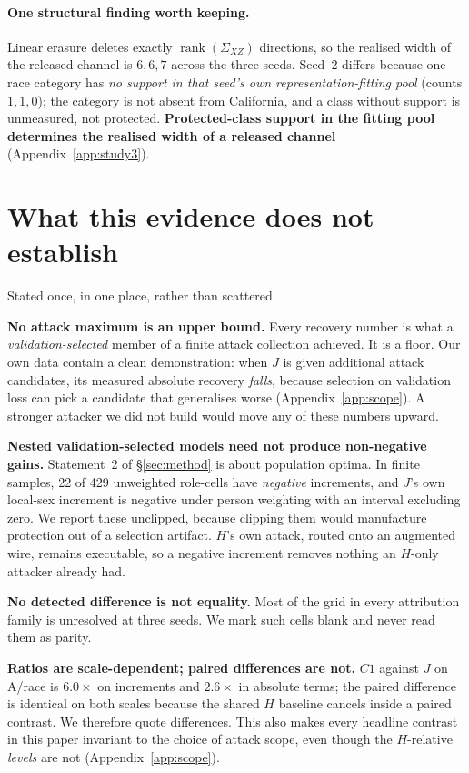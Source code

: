 \documentclass[10pt]{article}
\begin{document}
\paragraph{One structural finding worth keeping.} Linear erasure deletes exactly
$\operatorname{rank}(\Sigma_{XZ})$ directions, so the realised width of the released channel is
$6,6,7$ across the three seeds. Seed~2 differs because one race category has \emph{no support in that
seed's own representation-fitting pool} (counts $1,1,0$); the category is not absent from California,
and a class without support is unmeasured, not protected. \textbf{Protected-class support in the
fitting pool determines the realised width of a released channel} (Appendix~\ref{app:study3}).

\section{What this evidence does not establish}
\label{sec:limits}

Stated once, in one place, rather than scattered.

\textbf{No attack maximum is an upper bound.} Every recovery number is what a
\emph{validation-selected} member of a finite attack collection achieved. It is a floor. Our own data
contain a clean demonstration: when $J$ is given additional attack candidates, its measured absolute
recovery \emph{falls}, because selection on validation loss can pick a candidate that generalises
worse (Appendix~\ref{app:scope}). A stronger attacker we did not build would move any of these numbers
upward.

\textbf{Nested validation-selected models need not produce non-negative gains.} Statement~2 of
\S\ref{sec:method} is about population optima. In finite samples, 22 of 429 unweighted role-cells
have \emph{negative} increments, and $J$'s own local-sex increment is negative under person weighting
with an interval excluding zero. We report these unclipped, because clipping them would manufacture
protection out of a selection artifact. $H$'s own attack, routed onto an augmented wire, remains
executable, so a negative increment removes nothing an $H$-only attacker already had.

\textbf{No detected difference is not equality.} Most of the grid in every attribution family is
unresolved at three seeds. We mark such cells blank and never read them as parity.

\textbf{Ratios are scale-dependent; paired differences are not.} $C1$ against $J$ on A/race is
$6.0\times$ on increments and $2.6\times$ in absolute terms; the paired difference is identical on
both scales because the shared $H$ baseline cancels inside a paired contrast. We therefore quote
differences. This also makes every headline contrast in this paper invariant to the choice of attack
scope, even though the $H$-relative \emph{levels} are not (Appendix~\ref{app:scope}).
\end{document}
